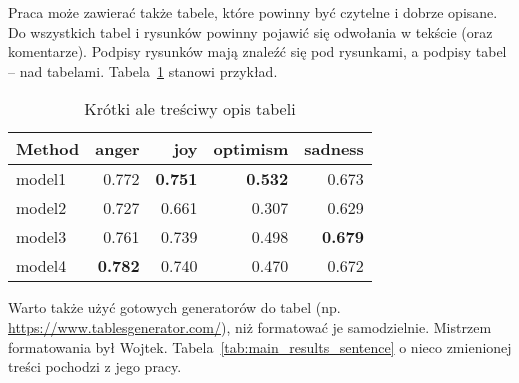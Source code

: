 Praca może zawierać także tabele, które powinny być czytelne i dobrze opisane. Do wszystkich tabel i rysunków powinny pojawić się odwołania w tekście (oraz komentarze). Podpisy rysunków mają znaleźć się pod rysunkami, a podpisy tabel – nad tabelami. Tabela~\ref{tab:tab_example} stanowi przykład.

\begin{table}[H]
    \centering
    \caption{Krótki ale treściwy opis tabeli} \label{tab:tab_example}
    \begin{tabular}{lrrrr}
        \toprule
        Method & anger          & joy            & optimism       & sadness        \\
        \midrule
        model1 & 0.772          & \textbf{0.751} & \textbf{0.532} & 0.673          \\
        model2 & 0.727          & 0.661          & 0.307          & 0.629          \\
        model3 & 0.761          & 0.739          & 0.498          & \textbf{0.679} \\
        model4 & \textbf{0.782} & 0.740          & 0.470          & 0.672          \\
        \bottomrule
    \end{tabular}
\end{table}

Warto także użyć gotowych generatorów do tabel (np. \url{https://www.tablesgenerator.com/}), niż formatować je samodzielnie. Mistrzem formatowania był Wojtek. Tabela~\ref{tab:main_results_sentence} o nieco zmienionej treści pochodzi z jego pracy.

